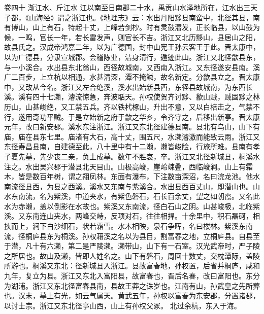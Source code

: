 \documentclass[12pt,UTF8]{ctexbook}
\begin{document}
卷四十  渐江水、斤江水 
江以南至日南郡二十水，禹贡山水泽地所在，江水出三天子都，《山海经》谓之浙江也。《地理志》云：水出丹阳黟县南蛮中，北径其县，南有博山，山上有石，特起十丈，上峰若剑杪。时有灵鼓潜发，正长临县，以山鼓为候，一鸣，官长一年，若长雷发声，则官长不吉。浙江又北历黟山，县居山之阳，故县氏之。汉成帝鸿嘉二年，以为广德国，封中山宪王孙云客王于此。晋太康中，以为广德县，分隶宣城郡。会稽陈业，洁身清行，遁迹此山。浙江又北径歙县东，与一小溪合。水出县东北翁山，西径故城南，又西南入浙江。又东径遂安县南。溪广二百步，上立杭以相通，水甚清深，潭不掩鳞，故名新定。分歙县立之。晋太康中，又改从今名。浙江又左合绝溪，溪水出始新县西，东径县故城南，为东西长溪。溪有四十七濑，濬流惊急，奔波聒天。孙权使贺齐讨黟、歙山贼，贼固黟之林历山，山甚峻绝，又工禁五兵。齐以铁杙椓山，升出不意，又以白棓击之，气禁不行，遂用奇功平贼。于是立始新之府于歙之华乡，令齐守之，后移出新亭。晋太康元年，改曰新安郡。溪水东注浙江。浙江又东北径建德县南。县北有乌山，山下有庙，庙在县东七里。庙渚有大石，高十丈，围五尺，水濑濬激而能致云雨。浙江又东径寿昌县南，自建德至此，八十里中有十二濑，濑皆峻险，行旅所难。县南有孝子夏先墓，先少丧二亲，负土成墓。数年不胜哀，卒。浙江又北径新城县，桐溪水注之。水出吴兴郡于潜县北天目山。山极高峻，崖岭竦叠，西临峻涧。山上有霜木，皆是数百年树，谓之翔凤林。东面有瀑布，下注数亩深沼，名曰浣龙池。他水南流径县西，为县之西溪。溪水又东南与紫溪合。水出县西百丈山，即潜山也。山水东南流，名为紫溪，中道夹水，有紫色磐石，石长百余丈，望之如朝霞。又名此水为赤濑，盖以倒影在水故也。紫溪又东南流，径白石山之阴。山甚峻极，北临紫溪。又东南连山夹水，两峰交峙，反项对石，往往相捍。十余里中，积石磊砢，相挟而上，涧下白沙细石，状若霜雪。水木相映，泉石争晖，名曰楼林。紫溪东南流，径桐庐县东为桐溪。孙权藉溪之名以为县目，割富春之地，立桐庐县。自县至于潜，凡十有六濑，第二是严陵濑。濑带山，山下有一石室。汉光武帝时，严子陵之所居也。故山及濑，皆即人姓名之。山下有磐石，周回十数丈，交枕潭际，盖陵所游也。桐溪又东北：径新城县入浙江。县故富春地，孙权置，后省并桐庐，咸和九年，复立为县。浙江又东北入富阳县，故富春也，晋后名春，改曰富阳也。东分为湖浦。浙江又东北径富春县南，县故王莽之诛岁也。江南有山，孙武皇之先所葬也。汉末，墓上有光，如云气属天。黄武五年，孙权以富春为东安郡，分置诸郡，以讨士宗。浙江又东北径亭山西，山上有孙权父冢。
北过余杭，东入于海。
\end{document}
